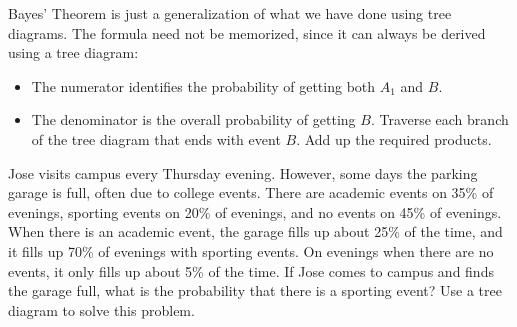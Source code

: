 Bayes' Theorem is just a generalization of what we have done using tree diagrams. The formula need not be memorized, since it can always be derived using a tree diagram:
\begin{itemize}
\setlength{\itemsep}{0mm}
\item The numerator identifies the probability of getting both $A_1$ and $B$.
\item The denominator is the overall probability of getting $B$. Traverse each branch of the tree diagram that ends with event $B$. Add up the required products.
\end{itemize}

\begin{exercisewrap}
\begin{nexercise} \label{exerciseForParkingLotOnCampusBeingFullAndWhetherOrNotThereIsASportingEvent}
Jose visits campus every Thursday evening. However, some days the parking garage is full, often due to college events. There are academic events on 35\% of evenings, sporting events on 20\% of evenings, and no events on 45\% of evenings. When there is an academic event, the garage fills up about 25\% of the time, and it fills up 70\% of evenings with sporting events. On evenings when there are no events, it only fills up about 5\% of the time. If Jose comes to campus and finds the garage full, what is the probability that there is a sporting event? Use a tree diagram to solve this problem.
\end{nexercise}
\end{exercisewrap}
